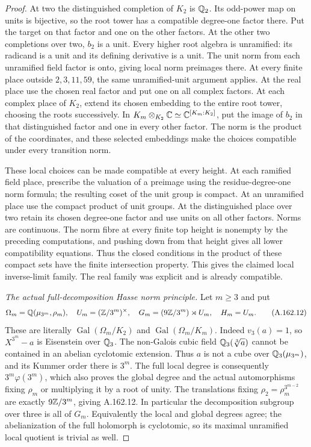 \begin{proof}
At two the distinguished completion of \(K_2\) is \(\mathbb Q_2\).
Its odd-power map on units is bijective, so the root tower has a
compatible degree-one factor there.  Put the target on that factor
and one on the other factors.  At the other two completions over two,
\(b_2\) is a unit.  Every higher root algebra is unramified: its
radicand is a unit and its defining derivative is a unit.  The unit
norm from each unramified field factor is onto, giving local norm
preimages there.  At every finite place outside \(2,3,11,59\), the
same unramified-unit argument applies.  At the real place use the
chosen real factor and put one on all complex factors.
At each complex place of \(K_2\), extend its chosen embedding to the
entire root tower, choosing the roots successively.  In
\(K_m\otimes_{K_2}\mathbb C\simeq\mathbb C^{[K_m:K_2]}\), put the image of
\(b_2\) in that distinguished factor and one in every other factor.
The norm is the product of the coordinates, and these selected embeddings
make the choices compatible under every transition norm.

These local choices can be made compatible at every height.
At each ramified field place, prescribe the valuation of a preimage
using the residue-degree-one norm formula; the resulting coset of the
unit group is compact.  At an unramified place use the compact product
of unit groups.  At the distinguished place over two retain its chosen
degree-one factor and use units on all other factors.  Norms are
continuous.  The norm fibre at every finite top height is nonempty by
the preceding computations, and pushing down from that height gives
all lower compatibility equations.  Thus the closed conditions in the
product of these compact sets have the finite intersection property.
This gives the claimed local inverse-limit family.  The real family
was explicit and is already compatible.

\emph{The actual full-decomposition Hasse norm principle.}
Let \(m\geq3\) and put
\[
 \Omega_m=\mathbb Q(\mu_{3^m},\rho_m),\quad U_m=(\mathbb Z/3^m)^\times,
 \quad G_m=(9\mathbb Z/3^m)\rtimes U_m,
 \quad H_m=U_m.
\tag{A.162.12}
\]
These are literally \(\operatorname{Gal}(\Omega_m/K_2)\) and
\(\operatorname{Gal}(\Omega_m/K_m)\).  Indeed \(v_3(a)=1\), so
\(X^{3^m}-a\) is Eisenstein over \(\mathbb Q_3\).
The non-Galois cubic field \(\mathbb Q_3(\sqrt[3]{a})\) cannot be contained
in an abelian cyclotomic extension.  Thus \(a\) is not a cube over
\(\mathbb Q_3(\mu_{3^m})\), and its Kummer order there is \(3^m\).
The full local degree is consequently \(3^m\varphi(3^m)\), which
also proves the global degree and the actual automorphisms fixing
\(\rho_m\) or multiplying it by a root of unity.
The translations fixing \(\rho_2=\rho_m^{3^{m-2}}\) are exactly
\(9\mathbb Z/3^m\), giving A.162.12.
In particular the decomposition subgroup over three is all of
\(G_m\).  Equivalently the local and global degrees agree; the
abelianization of the full holomorph is cyclotomic, so its maximal
unramified local quotient is trivial as well.


\end{proof}
